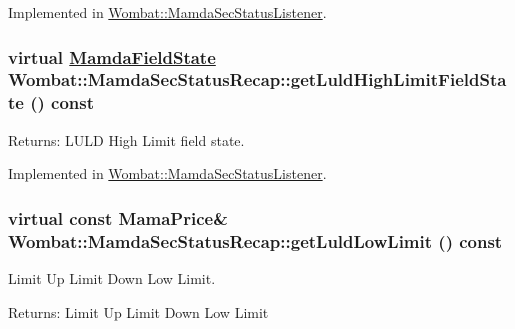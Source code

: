 Implemented in \hyperlink{classWombat_1_1MamdaSecStatusListener_92b109794eecdf44d3ae6f9ff6113a2b}{Wombat::Mamda\-Sec\-Status\-Listener}.\hypertarget{classWombat_1_1MamdaSecStatusRecap_1c7c1b9dd0362117ad1e877fa24a3227}{
\subsubsection[getLuldHighLimitFieldState]{\setlength{\rightskip}{0pt plus 5cm}virtual \hyperlink{namespaceWombat_93aac974f2ab713554fd12a1fa3b7d2a}{Mamda\-Field\-State} Wombat::Mamda\-Sec\-Status\-Recap::get\-Luld\-High\-Limit\-Field\-State () const}}
\label{classWombat_1_1MamdaSecStatusRecap_1c7c1b9dd0362117ad1e877fa24a3227}


\begin{Desc}
\item[Returns:]LULD High Limit field state. \end{Desc}


Implemented in \hyperlink{classWombat_1_1MamdaSecStatusListener_d56a6b2b5df893dd0ffc515ade629a43}{Wombat::Mamda\-Sec\-Status\-Listener}.\hypertarget{classWombat_1_1MamdaSecStatusRecap_5c40a583386f3c02006e31381fd99b17}{
\subsubsection[getLuldLowLimit]{\setlength{\rightskip}{0pt plus 5cm}virtual const Mama\-Price\& Wombat::Mamda\-Sec\-Status\-Recap::get\-Luld\-Low\-Limit () const}}
\label{classWombat_1_1MamdaSecStatusRecap_5c40a583386f3c02006e31381fd99b17}


Limit Up Limit Down Low Limit. 

\begin{Desc}
\item[Returns:]Limit Up Limit Down Low Limit \end{Desc}


